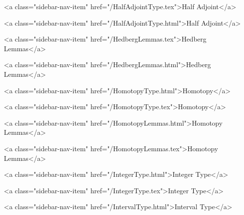       
        
          <a class="sidebar-nav-item" href="/HalfAdjointType.tex">Half Adjoint</a>
        
      
    
      
        
          <a class="sidebar-nav-item" href="/HalfAdjointType.html">Half Adjoint</a>
        
      
    
      
        
          <a class="sidebar-nav-item" href="/HedbergLemmas.tex">Hedberg Lemmas</a>
        
      
    
      
        
          <a class="sidebar-nav-item" href="/HedbergLemmas.html">Hedberg Lemmas</a>
        
      
    
      
        
          <a class="sidebar-nav-item" href="/HomotopyType.html">Homotopy</a>
        
      
    
      
        
          <a class="sidebar-nav-item" href="/HomotopyType.tex">Homotopy</a>
        
      
    
      
        
          <a class="sidebar-nav-item" href="/HomotopyLemmas.html">Homotopy Lemmas</a>
        
      
    
      
        
          <a class="sidebar-nav-item" href="/HomotopyLemmas.tex">Homotopy Lemmas</a>
        
      
    
      
        
          <a class="sidebar-nav-item" href="/IntegerType.html">Integer Type</a>
        
      
    
      
        
          <a class="sidebar-nav-item" href="/IntegerType.tex">Integer Type</a>
        
      
    
      
        
          <a class="sidebar-nav-item" href="/IntervalType.html">Interval Type</a>
        
      
    
